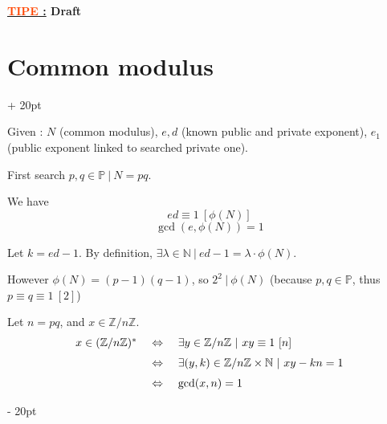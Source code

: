 \documentclass[a4paper, 12pt, twoside]{article}
\renewcommand{\emph}{\textcolor{ff4500}}
\newcommand{\N}{\mathbb{N}} %
\newcommand{\Z}{\mathbb{Z}} %
\newcommand{\ssi}{\ \Leftrightarrow \ }
\newcommand{\ind}[1][20pt]{\advance\leftskip + #1}
\newcommand{\deind}[1][20pt]{\advance\leftskip - #1}
\newenvironment{indt}[2][20pt]{#2 \par \ind[#1]}{\par \deind} %
\newcommand{\thetitle}[2]{\begin{center}\textbf{{\LARGE \underline{\emph{#1} :}} {\Large #2}}\end{center}}
\begin{document}
    
    
    \thetitle{TIPE}{Draft}
    
    \tableofcontents
    \newpage
    
    
    \begin{indt}{\section{Common modulus}}
        
        Given : $N$ (common modulus), $e, d$ (known public and private exponent), $e_1$ (public exponent linked to searched private one).
        
        First search $p, q \in \mathbb P\ |\ N = pq$.
        
        We have 
            \[ ed \equiv 1 \ [\phi(N)] \]
            \[ \gcd(e, \phi(N)) = 1 \]
        
        
        Let $k = ed - 1$. By definition, $\exists \lambda \in \N\ |\ ed - 1 = \lambda \cdot \phi(N)$.
        
        However $\phi(N) = (p - 1)(q - 1)$, so $2^2\ |\ \phi(N)$ (because $p, q \in \mathbb P$, thus $p \equiv q \equiv 1 \ [2]$)

        \vspace{12pt}

        Let $n = pq$, and $x \in \Z/n\Z$.
            \[
                \begin{array}{rcl}
                    x \in (\Z/n\Z)^* &\ssi& \exists y \in \Z/n\Z \ |\ xy \equiv 1\ [n]
                    \vspace{6pt}
                    \\
                    &\ssi& \exists (y, k) \in \Z/n\Z \times \N\ |\ xy - kn = 1
                    \vspace{6pt}
                    \\
                    &\ssi& \gcd(x, n) = 1
                \end{array}
            \]
        
    \end{indt}

    \vspace{12pt}
    
\end{document}
